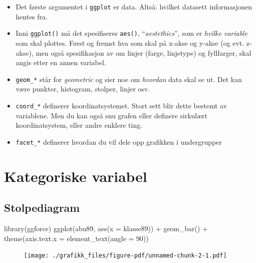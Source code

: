 \documentclass[
  letterpaper,
  DIV=11,
  numbers=noendperiod]{scrreprt}
\newenvironment{Shaded}{\begin{snugshade}}{\end{snugshade}}
\newcommand{\AttributeTok}[1]{\textcolor[rgb]{0.40,0.45,0.13}{#1}}
\newcommand{\DecValTok}[1]{\textcolor[rgb]{0.68,0.00,0.00}{#1}}
\newcommand{\FunctionTok}[1]{\textcolor[rgb]{0.28,0.35,0.67}{#1}}
\newcommand{\NormalTok}[1]{\textcolor[rgb]{0.00,0.23,0.31}{#1}}
\newcommand{\SpecialCharTok}[1]{\textcolor[rgb]{0.37,0.37,0.37}{#1}}
\providecommand{\tightlist}{%
  \setlength{\itemsep}{0pt}\setlength{\parskip}{0pt}}\usepackage{longtable,booktabs,array}
\theoremstyle{definition}
\theoremstyle{remark}
\begin{document}
\begin{itemize}
\tightlist
\item
  Det første argumentet i \texttt{ggplot} er data. Altså: hvilket
  datasett informasjonen hentes fra.
\item
  Inni \texttt{ggplot()} må det spesifiseres \texttt{aes()},
  ``\emph{aestethics}'', som er \emph{hvilke variable} som skal plottes.
  Først og fremst hva som skal på x-akse og y-akse (og evt. z-akse), men
  også spesifikasjon av om linjer (farge, linjetype) og fyllfarger, skal
  angis etter en annen variabel.
\item
  \texttt{geom\_*} står for \emph{geometric} og sier noe om
  \emph{hvordan} data skal se ut. Det kan være punkter, histogram,
  stolper, linjer osv.
\item
  \texttt{coord\_*} definerer koordinatsystemet. Stort sett blir dette
  bestemt av variablene. Men du kan også snu grafen eller definere
  sirkulært koordinatsystem, eller andre enklere ting.
\item
  \texttt{facet\_*} definerer hvordan du vil dele opp grafikken i
  undergrupper
\end{itemize}

\hypertarget{kategoriske-variabel}{%
\section{Kategoriske variabel}\label{kategoriske-variabel}}

\hypertarget{stolpediagram}{%
\subsection{Stolpediagram}\label{stolpediagram}}

\begin{Shaded}
\begin{Highlighting}[]
\FunctionTok{library}\NormalTok{(ggforce)}
\FunctionTok{ggplot}\NormalTok{(abu89, }\FunctionTok{aes}\NormalTok{(}\AttributeTok{x =}\NormalTok{ klasse89)) }\SpecialCharTok{+}
  \FunctionTok{geom\_bar}\NormalTok{() }\SpecialCharTok{+}
  \FunctionTok{theme}\NormalTok{(}\AttributeTok{axis.text.x =} \FunctionTok{element\_text}\NormalTok{(}\AttributeTok{angle =} \DecValTok{90}\NormalTok{))}
\end{Highlighting}
\end{Shaded}

\begin{figure}[H]

{\centering \texttt{[image: ./grafikk\_files/figure-pdf/unnamed-chunk-2-1.pdf]}

}

\end{figure}
\end{document}
